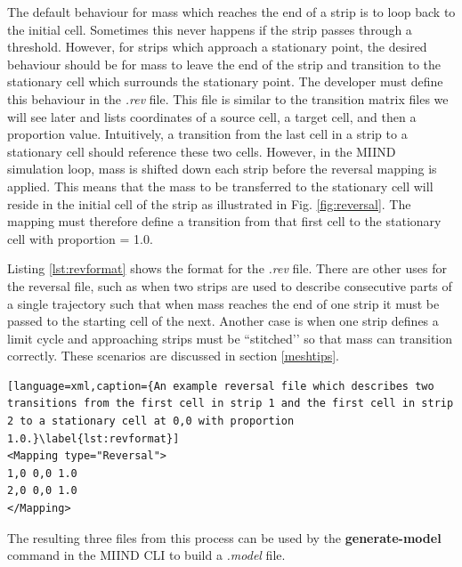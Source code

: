 \documentclass[utf8]{frontiers_suppmat} %
\begin{document}
The default behaviour for mass which reaches the end of a strip is to loop back to the initial cell. Sometimes this never happens if the strip passes through a threshold. However, for strips which approach a stationary point, the desired behaviour should be for mass to leave the end of the strip and transition to the stationary cell which surrounds the stationary point. The developer must define this behaviour in the \textit{.rev} file. This file is similar to the transition matrix files we will see later and lists coordinates of a source cell, a target cell, and then a proportion value. Intuitively, a transition from the last cell in a strip to a stationary cell should reference these two cells. However, in the MIIND simulation loop, mass is shifted down each strip before the reversal mapping is applied. This means that the mass to be transferred to the stationary cell will reside in the initial cell of the strip as illustrated in Fig. \ref{fig:reversal}. The mapping must therefore define a transition from that first cell to the stationary cell with proportion = 1.0.

Listing \ref{lst:revformat} shows the format for the \textit{.rev} file. There are other uses for the reversal file, such as when two strips are used to describe consecutive parts of a single trajectory such that when mass reaches the end of one strip it must be passed to the starting cell of the next. Another case is when one strip defines a limit cycle and approaching strips must be ``stitched’’ so that mass can transition correctly. These scenarios are discussed in section \ref{meshtips}.

\begin{lstlisting}[language=xml,caption={An example reversal file which describes two transitions from the first cell in strip 1 and the first cell in strip 2 to a stationary cell at 0,0 with proportion 1.0.}\label{lst:revformat}]
<Mapping type="Reversal">
1,0	0,0	1.0
2,0	0,0	1.0
</Mapping>
\end{lstlisting}

The resulting three files from this process can be used by the \textbf{generate-model} command in the MIIND CLI to build a \textit{.model} file.\\
\end{document}
